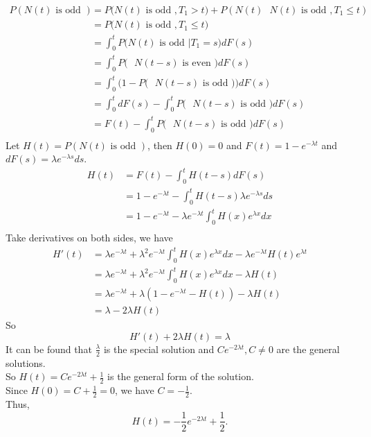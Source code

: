 \documentclass{amsart}
\theoremstyle{plain}
\theoremstyle{definition}
\begin{document}
\begin{align*}
	P(N(t) \text{ is odd } ) &= P\big(N(t) \text{ is odd }, T_1 > t\big) + P(N(t) \text{ $N(t)$ is odd }, T_1 \leq t) \\
							 &= P\big(N(t)\text{ is odd }, T_1 \leq t\big) \\
						 	 &= \int_{0}^{t}P\big(N(t) \text{ is odd }|T_1 = s\big)dF(s) \\
							 &= \int_{0}^{t}P\big(\text{ $N(t-s)$ is even })dF(s) \\
							 &= \int_{0}^{t}\Big(1-P\big(\text{ $N(t-s)$ is odd }\big)\Big)dF(s) \\
							 &= \int_{0}^{t}dF(s) -\int_{0}^{t}P\big(\text{ $N(t-s)$ is odd }\big)dF(s) \\
							 &= F(t) -\int_{0}^{t}P\big(\text{ $N(t-s)$ is odd }\big)dF(s) \\
\end{align*}
Let $H(t) = P(N(t) \text{ is odd } )$, then $H(0) = 0$ and $F(t) = 1 -e^{-\lambda t}$ and $dF(s) = \lambda e^{-\lambda s}ds$.
\begin{align*}
	H(t) &= F(t)-\int_{0}^{t}H(t-s)dF(s) \\
			   &= 1 -e^{-\lambda t} - \int_{0}^{t}H(t-s) \lambda e^{-\lambda s}ds \\
			   &=1 -e^{-\lambda t} - \lambda e^{-\lambda t}\int_{0}^{t}H(x)e^{\lambda x}dx \\
\end{align*}
Take derivatives on both sides, we have\\
\begin{align*}
	H'(t) &= \lambda e^{-\lambda t} +\lambda^2e^{-\lambda t}\int_{0}^{t}H(x)e^{\lambda x}dx-\lambda e^{-\lambda t}H(t)e^{\lambda t}\\
		  &= \lambda e^{-\lambda t} +\lambda^2e^{-\lambda t}\int_{0}^{t}H(x)e^{\lambda x}dx-\lambda H(t)\\
		  &= \lambda e^{-\lambda t} + \lambda(1-e^{-\lambda t}-H(t)) -\lambda H(t)\\
		  &= \lambda - 2\lambda H(t) 
\end{align*}
So 
\[H'(t) + 2\lambda H(t) = \lambda \]
It can be found that $\frac{\lambda}{2}$ is the special solution and $Ce^{-2\lambda t}, C \neq 0$ are the general solutions.\\
So $H(t) = Ce^{-2\lambda t} + \frac{1}{2}$ is the general form of the solution.\\
Since $H(0) = C+ \frac{1}{2} = 0$, we have $C = -\frac{1}{2}$.\\
Thus,
\[ H(t) = -\frac{1}{2}e^{-2\lambda t} + \frac{1}{2}.\]
\end{document}
